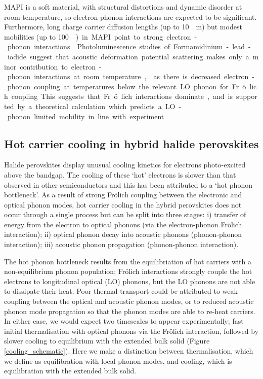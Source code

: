 MAPI is a soft material, with structural distortions and dynamic disorder at room temperature, so electron-phonon interactions are expected to be significant.
Furthermore, long charge carrier diffusion lengths (up to \SI{10}{\mico\metre}) but modest mobilities (up to \SI{100}{\centimetre\square\per\volt\second}) in MAPI point to strong electron-phonon interactions.\autocite{Brenner2015} 
Photoluminescence studies of Formamidinium-lead-iodide suggest that acoustic deformation potential scattering makes only a minor contribution to electron-phonon interactions at room temperature,\autocite{Wright2016}
as there is decreased electron-phonon coupling at temperatures below the relevant LO phonon for Fr\"{o}lich coupling. This suggests that Fr\"{o}lich interactions dominate, and is supported by a theoretical calculation which predicts a LO-phonon limited mobility in line with experiment.\autocite{Frost2017b}

\subsection{Hot carrier cooling in hybrid halide perovskites}

Halide perovskites display unusual cooling kinetics for electrons photo-excited above the bandgap.
The cooling of these `hot' electrons is slower than that observed in other semiconductors and this has been attributed to a `hot phonon bottleneck'.\autocite{Yang2016e,Yang2017a} %
As a result of strong Fr\"{o}lich coupling between the electronic and optical phonon modes, hot carrier cooling in the hybrid perovskites does not occur through a single process but can be split into three stages: i) transfer of energy from the electron to optical phonons (via the electron-phonon Fr\"{o}lich interaction); ii) optical phonon decay into acoustic phonons (phonon-phonon interaction); iii) acoustic phonon propagation (phonon-phonon interaction).

The hot phonon bottleneck results from the equilibriation of hot carriers with a non-equilibrium phonon population;
Fr\"{o}lich interactions strongly couple the hot electrons to longitudinal optical (LO) phonons, but the LO phonons are not able to dissipate their heat. 
Poor thermal transport could be attributed to weak coupling between the optical and acoustic phonon modes, or to reduced acoustic phonon mode propagation so that the phonon modes are able to re-heat carriers.
In either case, we would expect two timescales to appear experimentally; fast initial thermalisation with optical phonons via the Fr\"{o}lich interaction, followed by slower cooling to equilibrium with the extended bulk solid (Figure \ref{cooling_schematic}). Here we make a distinction between thermalisation, which we define as equilibration with local phonon modes, and cooling, which is equilibration with the extended bulk solid.

